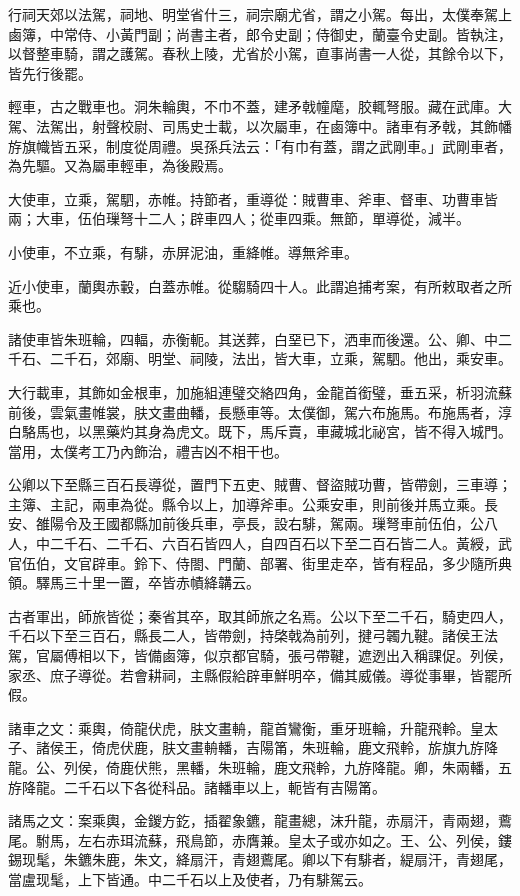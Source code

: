 \begin{pinyinscope}
行祠天郊以法駕，祠地、明堂省什三，祠宗廟尤省，謂之小駕。每出，太僕奉駕上鹵簿，中常侍、小黃門副；尚書主者，郎令史副；侍御史，蘭臺令史副。皆執注，以督整車騎，謂之護駕。春秋上陵，尤省於小駕，直事尚書一人從，其餘令以下，皆先行後罷。

輕車，古之戰車也。洞朱輪輿，不巾不蓋，建矛戟幢麾，胶輒弩服。藏在武庫。大駕、法駕出，射聲校尉、司馬史士載，以次屬車，在鹵簿中。諸車有矛戟，其飾幡斿旗幟皆五采，制度從周禮。吳孫兵法云：「有巾有蓋，謂之武剛車。」武剛車者，為先驅。又為屬車輕車，為後殿焉。

大使車，立乘，駕駟，赤帷。持節者，重導從：賊曹車、斧車、督車、功曹車皆兩；大車，伍伯璅弩十二人；辟車四人；從車四乘。無節，單導從，減半。

小使車，不立乘，有騑，赤屏泥油，重絳帷。導無斧車。

近小使車，蘭輿赤轂，白蓋赤帷。從騶騎四十人。此謂追捕考案，有所敕取者之所乘也。

諸使車皆朱班輪，四輻，赤衡軛。其送葬，白堊已下，洒車而後還。公、卿、中二千石、二千石，郊廟、明堂、祠陵，法出，皆大車，立乘，駕駟。他出，乘安車。

大行載車，其飾如金根車，加施組連璧交絡四角，金龍首銜璧，垂五采，析羽流蘇前後，雲氣畫帷裳，肤文畫曲轓，長懸車等。太僕御，駕六布施馬。布施馬者，淳白駱馬也，以黑藥灼其身為虎文。既下，馬斥賣，車藏城北祕宮，皆不得入城門。當用，太僕考工乃內飾治，禮吉凶不相干也。

公卿以下至縣三百石長導從，置門下五吏、賊曹、督盜賊功曹，皆帶劍，三車導；主簿、主記，兩車為從。縣令以上，加導斧車。公乘安車，則前後并馬立乘。長安、雒陽令及王國都縣加前後兵車，亭長，設右騑，駕兩。璅弩車前伍伯，公八人，中二千石、二千石、六百石皆四人，自四百石以下至二百石皆二人。黃綬，武官伍伯，文官辟車。鈴下、侍閤、門蘭、部署、街里走卒，皆有程品，多少隨所典領。驛馬三十里一置，卒皆赤幘絳韝云。

古者軍出，師旅皆從；秦省其卒，取其師旅之名焉。公以下至二千石，騎吏四人，千石以下至三百石，縣長二人，皆帶劍，持棨戟為前列，揵弓韣九鞬。諸侯王法駕，官屬傅相以下，皆備鹵簿，似京都官騎，張弓帶鞬，遮迾出入稱課促。列侯，家丞、庶子導從。若會耕祠，主縣假給辟車鮮明卒，備其威儀。導從事畢，皆罷所假。

諸車之文：乘輿，倚龍伏虎，肤文畫輈，龍首鸞衡，重牙班輪，升龍飛軨。皇太子、諸侯王，倚虎伏鹿，肤文畫輈轓，吉陽筩，朱班輪，鹿文飛軨，旂旗九斿降龍。公、列侯，倚鹿伏熊，黑轓，朱班輪，鹿文飛軨，九斿降龍。卿，朱兩轓，五斿降龍。二千石以下各從科品。諸轓車以上，軛皆有吉陽筩。

諸馬之文：案乘輿，金鍐方釳，插翟象鑣，龍畫總，沫升龍，赤扇汗，青兩翅，鷰尾。駙馬，左右赤珥流蘇，飛鳥節，赤膺兼。皇太子或亦如之。王、公、列侯，鏤錫现髦，朱鑣朱鹿，朱文，絳扇汗，青翅鷰尾。卿以下有騑者，緹扇汗，青翅尾，當盧现髦，上下皆通。中二千石以上及使者，乃有騑駕云。


\end{pinyinscope}